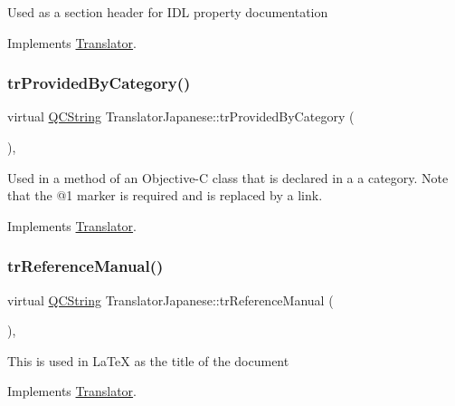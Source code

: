 Used as a section header for I\+DL property documentation 

Implements \mbox{\hyperlink{class_translator}{Translator}}.

\mbox{\label{class_translator_japanese_af2c9ab0ae3d70a4d00410f86665847b0}} 
\subsubsection{\texorpdfstring{trProvidedByCategory()}{trProvidedByCategory()}}
{\footnotesize\ttfamily virtual \mbox{\hyperlink{class_q_c_string}{Q\+C\+String}} Translator\+Japanese\+::tr\+Provided\+By\+Category (\begin{DoxyParamCaption}{ }\end{DoxyParamCaption})\hspace{0.3cm}{\ttfamily [inline]}, {\ttfamily [virtual]}}

Used in a method of an Objective-\/C class that is declared in a a category. Note that the @1 marker is required and is replaced by a link. 

Implements \mbox{\hyperlink{class_translator}{Translator}}.

\mbox{\label{class_translator_japanese_a3ef1208fb4ac77da0f22917cd73c0baf}} 
\subsubsection{\texorpdfstring{trReferenceManual()}{trReferenceManual()}}
{\footnotesize\ttfamily virtual \mbox{\hyperlink{class_q_c_string}{Q\+C\+String}} Translator\+Japanese\+::tr\+Reference\+Manual (\begin{DoxyParamCaption}{ }\end{DoxyParamCaption})\hspace{0.3cm}{\ttfamily [inline]}, {\ttfamily [virtual]}}

This is used in La\+TeX as the title of the document 

Implements \mbox{\hyperlink{class_translator}{Translator}}.

